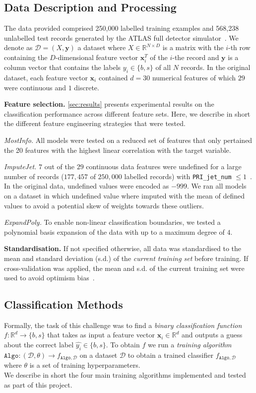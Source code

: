 \documentclass[10pt,conference,compsocconf]{IEEEtran}
\newcommand{\parabf}[1]{\vspace{1mm}\noindent\textbf{#1}}
\newcommand{\parait}[1]{\vspace{1mm}\noindent\textit{#1}}
\newcommand{\Data}{\mathcal{D}}
\newcommand{\features}{\mathbf{x}_i}
\newcommand{\target}{y_i}
\newcommand{\targetset}{\{ b, s \}}
\newcommand{\targetvector}{\mathbf{y}}
\newcommand{\classifier}[2]{f_{#1, #2}}
\newcommand{\Train}{\mathtt{Algo}}
\begin{document}
\subsection{Data Description and Processing}
\label{sec:data}
The data provided comprised 250,000 labelled training examples and 568,238 unlabelled test records generated by the ATLAS full detector simulator~\cite{HiggsML}.
We denote as $\Data = (X, \targetvector)$ a dataset where $X \in \mathbb{R}^{N \times D}$ is a matrix with the $i$-th row containing the $D$-dimensional feature vector $\features^T$ of the $i$-the record and $\targetvector$ is a column vector that contains the labels $\target \in \targetset$ of all $N$ records.       
In the original dataset, each feature vector $\features$ contained $d=30$ numerical features of which $29$ were continuous and $1$ discrete.  

\parabf{Feature selection.} \autoref{sec:results} presents experimental results on the classification performance across different feature sets. Here, we describe in short the different feature engineering strategies that were tested.

\parait{MostInfo.} All models were tested on a reduced set of features that only pertained the 20 features with the highest linear correlation with the target variable.

\parait{ImputeJet.} $7$ out of the $29$ continuous data features were undefined for a large number of records ($177,457$ of $250,000$ labelled records) with \texttt{PRI\_jet\_num} $\leq 1$~\cite{OpenDataCERN}. In the original data, undefined values were encoded as $-999$. We ran all models on a dataset in which undefined value where imputed with the mean of defined values to avoid a potential skew of weights towards these outliers.

\parait{ExpandPoly.} To enable non-linear classification boundaries, we tested a polynomial basis expansion of the data with up to a maximum degree of $4$.

\parabf{Standardisation.} If not specified otherwise, all data was standardised to the mean and standard deviation (s.d.) of the \emph{current training set} before training. If cross-validation was applied, the mean and s.d. of the current training set were used to avoid optimism bias~\cite{Domingos2012}. 

\vspace*{-2mm}
\subsection{Classification Methods}
Formally, the task of this challenge was to find a \emph{binary classification function} $f: \mathbb{R}^d \rightarrow \targetset$ that takes as input a feature vector $\features \in \mathbb{R}^d$ and outputs a guess about the correct label $\hat{\target} \in \targetset$. To obtain $f$ we run a \emph{training algorithm} $\Train: (\Data, \theta) \rightarrow \classifier{\Train}{\Data}$ on a dataset $\Data$ to obtain a trained classifier $\classifier{\Train}{\Data}$ where $\theta$ is a set of training hyperparameters.\\
We describe in short the four main training algorithms implemented and tested as part of this project.
\end{document}
